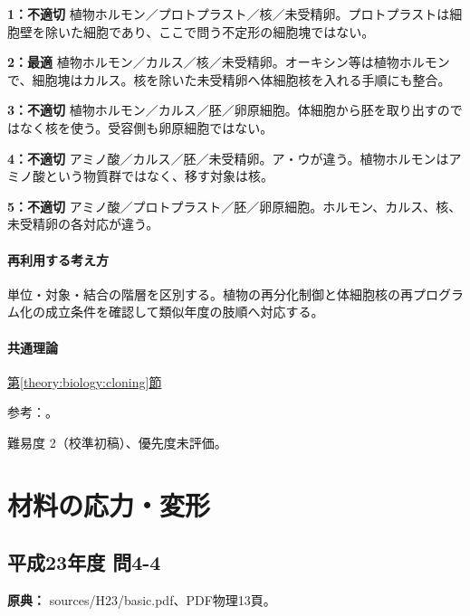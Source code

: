 \noindent\textbf{1：不適切} 植物ホルモン／プロトプラスト／核／未受精卵。プロトプラストは細胞壁を除いた細胞であり、ここで問う不定形の細胞塊ではない。\par

\noindent\textbf{2：最適} 植物ホルモン／カルス／核／未受精卵。オーキシン等は植物ホルモンで、細胞塊はカルス。核を除いた未受精卵へ体細胞核を入れる手順にも整合。\par

\noindent\textbf{3：不適切} 植物ホルモン／カルス／胚／卵原細胞。体細胞から胚を取り出すのではなく核を使う。受容側も卵原細胞ではない。\par

\noindent\textbf{4：不適切} アミノ酸／カルス／胚／未受精卵。ア・ウが違う。植物ホルモンはアミノ酸という物質群ではなく、移す対象は核。\par

\noindent\textbf{5：不適切} アミノ酸／プロトプラスト／胚／卵原細胞。ホルモン、カルス、核、未受精卵の各対応が違う。\par

\paragraph{再利用する考え方} 単位・対象・結合の階層を区別する。植物の再分化制御と体細胞核の再プログラム化の成立条件を確認して類似年度の肢順へ対応する。

\paragraph{共通理論} \hyperref[theory:biology:cloning]{第\ref*{theory:biology:cloning}節}

\par 参考：\cite{plant_regeneration,nhgri_cloning}。

\par 難易度 2（校準初稿）、優先度未評価。

\section{材料の応力・変形}

\subsection{平成23年度 問4-4}
\label{q:h23-reg-basic-4-4}

\noindent\textbf{原典：} sources/H23/basic.pdf、PDF物理13頁。

